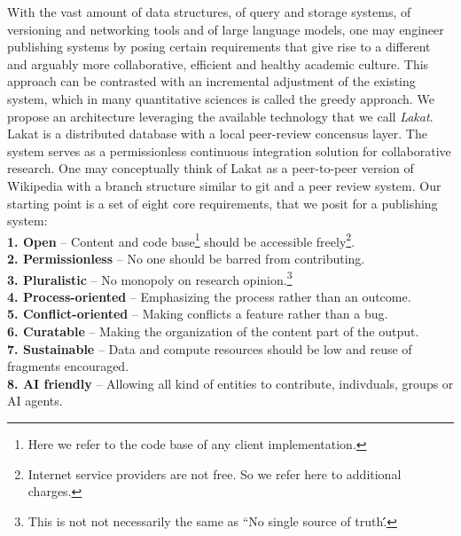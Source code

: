 \documentclass[14pt]{article}
\begin{document}
With the vast amount of data structures, of query and storage systems, of versioning and networking tools and of large language models, one may engineer publishing systems by posing certain requirements that give rise to a different and arguably more collaborative, efficient and healthy academic culture. This approach can be contrasted with an incremental adjustment of the existing system, which in many quantitative sciences is called the greedy approach. We propose an architecture leveraging the available technology that we call \textit{Lakat}.
Lakat is a distributed database with a local peer-review concensus layer. The system serves as a permissionless continuous integration solution for collaborative research. One may conceptually think of Lakat as a peer-to-peer version of Wikipedia with a branch structure similar to git and a peer review system.
Our starting point is a set of eight core requirements, that we posit for a publishing system:\\

\indent \textbf{1. Open} -- 
 Content and code base\footnote{Here we refer to the code base of any client implementation.} should be accessible freely\footnote{Internet service providers are not free. So we refer here to additional charges.}.\\
\indent\textbf{2. Permissionless} --
 No one should be barred from contributing.\\
\indent\textbf{3. Pluralistic} -- No monopoly on research opinion.\footnote{This is not not necessarily the same as ``No single source of truth\'\'.}\\
\indent\textbf{4. Process-oriented} -- Emphasizing the process rather than an outcome.\\
\indent\textbf{5. Conflict-oriented} -- Making conflicts a feature rather than a bug.\\
\indent\textbf{6. Curatable} -- Making the organization of the content part of the output.\\
\indent\textbf{7. Sustainable} -- 
 Data and compute resources should be low and reuse of fragments encouraged.\\
\indent\textbf{8. AI friendly} -- Allowing all kind of entities to contribute, indivduals, groups or AI agents.\\
\end{document}

